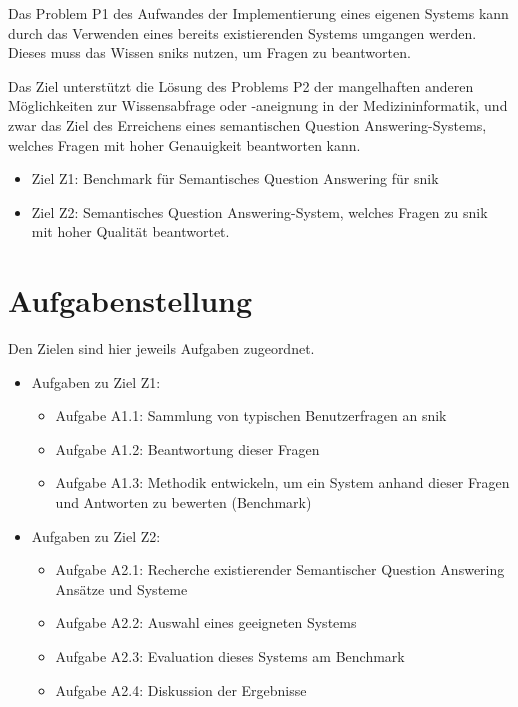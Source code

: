 Das Problem P1 des Aufwandes der Implementierung eines eigenen Systems kann durch das Verwenden eines bereits existierenden Systems umgangen werden.
Dieses muss das Wissen \acs{snik}s nutzen, um Fragen zu beantworten.

Das Ziel unterstützt die Lösung des Problems P2 der mangelhaften anderen Möglichkeiten zur Wissensabfrage oder -aneignung in der Medizininformatik,
und zwar das Ziel des Erreichens eines semantischen Question Answering-Systems, welches Fragen mit hoher Genauigkeit beantworten kann.

\begin{itemize}
	\item Ziel Z1: Benchmark für Semantisches Question Answering für \acs{snik}
	\item Ziel Z2: Semantisches Question Answering-System, welches Fragen zu \acs{snik} mit hoher Qualität beantwortet.
\end{itemize}
\section{Aufgabenstellung}

Den Zielen sind hier jeweils Aufgaben zugeordnet.

\begin{itemize}

	\item Aufgaben zu Ziel Z1:
	\begin{itemize}
		\item Aufgabe A1.1: Sammlung von typischen Benutzerfragen an \acs{snik}
		\item Aufgabe A1.2: Beantwortung dieser Fragen
		\item Aufgabe A1.3: Methodik entwickeln, um ein System anhand dieser Fragen und Antworten zu bewerten (Benchmark)
	\end{itemize}
	\item Aufgaben zu Ziel Z2:
	\begin{itemize}
		\item Aufgabe A2.1: Recherche existierender Semantischer Question Answering Ansätze und Systeme
		\item Aufgabe A2.2: Auswahl eines geeigneten Systems
		\item Aufgabe A2.3: Evaluation dieses Systems am Benchmark
		\item Aufgabe A2.4: Diskussion der Ergebnisse
	\end{itemize}
\end{itemize}

